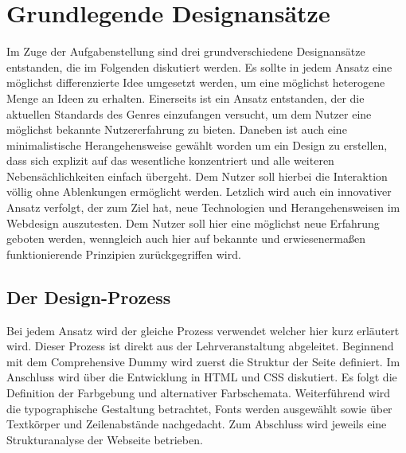\section{Grundlegende Designansätze}
Im Zuge der Aufgabenstellung sind drei grundverschiedene Designansätze entstanden, die im Folgenden diskutiert werden. Es sollte in jedem Ansatz eine möglichst differenzierte Idee umgesetzt werden, um eine möglichst heterogene Menge an Ideen zu erhalten.
Einerseits ist ein Ansatz entstanden, der die aktuellen Standards des Genres einzufangen versucht, um dem Nutzer eine möglichst bekannte Nutzererfahrung zu bieten.
Daneben ist auch eine minimalistische Herangehensweise gewählt worden um ein Design zu erstellen, dass sich explizit auf das wesentliche konzentriert und alle weiteren Nebensächlichkeiten einfach übergeht. Dem Nutzer soll hierbei die Interaktion völlig ohne Ablenkungen ermöglicht werden.
Letzlich wird auch ein innovativer Ansatz verfolgt, der zum Ziel hat, neue Technologien und Herangehensweisen im Webdesign auszutesten. Dem Nutzer soll hier eine möglichst neue Erfahrung geboten werden, wenngleich auch hier auf bekannte und erwiesenermaßen funktionierende Prinzipien zurückgegriffen wird.
\subsection{Der Design-Prozess}
Bei jedem Ansatz wird der gleiche Prozess verwendet welcher hier kurz erläutert wird. Dieser Prozess ist direkt aus der Lehrveranstaltung abgeleitet.
Beginnend mit dem Comprehensive Dummy wird zuerst die Struktur der Seite definiert. Im Anschluss wird über die Entwicklung in HTML und CSS diskutiert. Es folgt die Definition der Farbgebung und alternativer Farbschemata. Weiterführend wird die typographische Gestaltung betrachtet, Fonts werden ausgewählt sowie über Textkörper und Zeilenabstände nachgedacht. Zum Abschluss wird jeweils eine Strukturanalyse der Webseite betrieben.